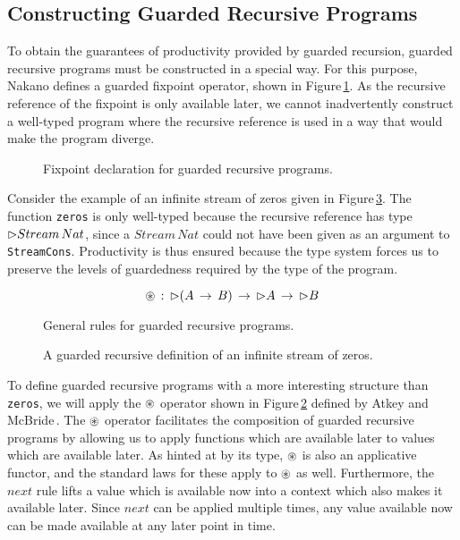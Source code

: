 \subsection{Constructing Guarded Recursive Programs}
\label{sec:constr-guard-recurs}
To obtain the guarantees of productivity provided by guarded recursion, guarded recursive programs must be constructed in a special way. For this purpose, Nakano defines a guarded fixpoint operator, shown in Figure\,\ref{fig:guarded_recursion_fixpoint}. As the recursive reference of the fixpoint is only available later, we cannot inadvertently construct a well-typed program where the recursive reference is used in a way that would make the program diverge.
\begin{figure}

\caption{Fixpoint declaration for guarded recursive programs.}
\label{fig:guarded_recursion_fixpoint}
\end{figure} 
Consider the example of an infinite stream of zeros given in Figure\,\ref{fig:guarded_recursion_zeros}. The function \texttt{zeros} is only well-typed because the recursive reference has type $\rhd Stream\,Nat$, since a $Stream\,Nat$ could not have been given as an argument to \texttt{StreamCons}. Productivity is thus ensured because the type system forces us to preserve the levels of guardedness required by the type of the program.
\begin{figure}
\[
\circledast \, :\, \rhd (A\, \rightarrow \, B)\, \rightarrow \, \rhd A\, \rightarrow \, \rhd B
\]

\caption{General rules for guarded recursive programs.}
\label{fig:guarded_recursion_rules}
\end{figure}

\begin{figure}

\caption{A guarded recursive definition of an infinite stream of zeros.}
\label{fig:guarded_recursion_zeros}
\end{figure} 
To define guarded recursive programs with a more interesting structure than \texttt{zeros}, we will apply the $\circledast$ operator shown in Figure\,\ref{fig:guarded_recursion_rules} defined by Atkey and McBride\,\citep{Atkey:2013}. The $\circledast$ operator facilitates the composition of guarded recursive programs by allowing us to apply functions which are available later to values which are available later. As hinted at by its type, $\circledast$ is also an applicative functor, and the standard laws for these apply to $\circledast$ as well. Furthermore, the $next$ rule lifts a value which is available now into a context which also makes it available later. Since $next$ can be applied multiple times, any value available now can be made available at any later point in time.

